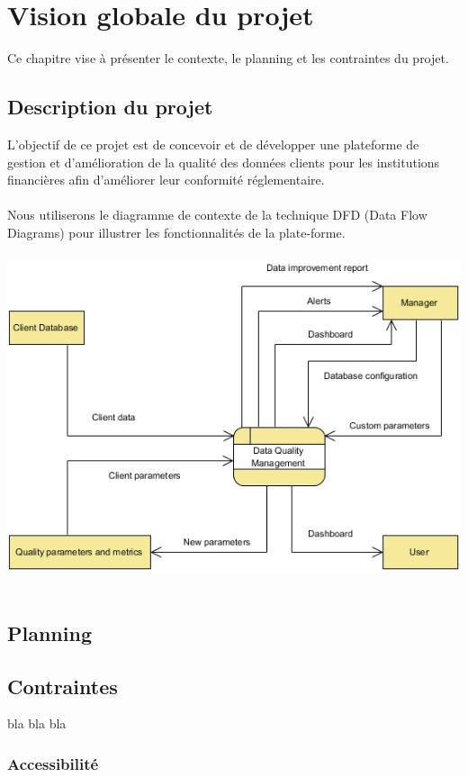 \documentclass[french]{book}
\begin{document}
\chapter{Vision globale du projet}
Ce chapitre vise à présenter le contexte, le planning et les contraintes du projet.
\section{Description du projet}

L'objectif de ce projet est de concevoir et de développer une plateforme de gestion et d'amélioration de la qualité des données clients pour les institutions financières afin d'améliorer leur conformité réglementaire.
\\
\\
Nous utiliserons le diagramme de contexte de la technique DFD (Data Flow Diagrams) pour illustrer les fonctionnalités de la plate-forme. 
\\
\\
\includegraphics[width=\textwidth]{img/Context_DFD.jpg}\\
\\


\section{Planning}

\section{Contraintes}
bla bla bla

\subsection{Accessibilité}
\end{document}

